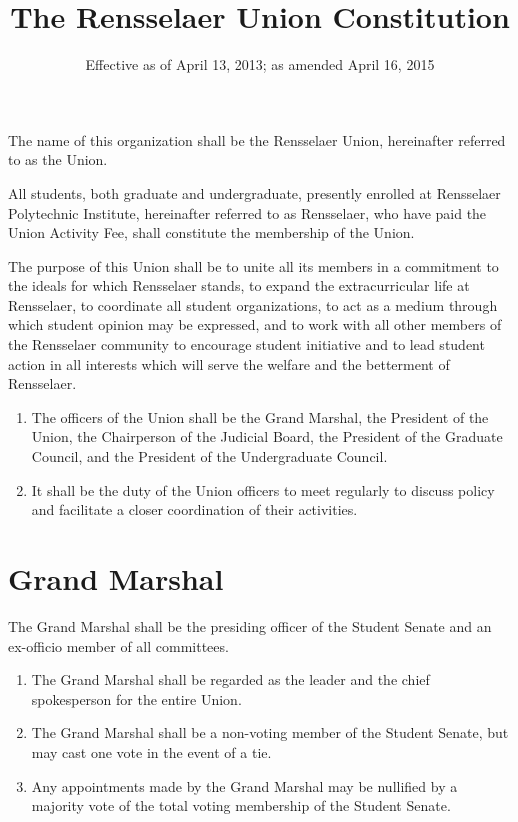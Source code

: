 \documentclass[12pt]{constitution}
\title{The Rensselaer Union Constitution}
\author{Effective as of April 13, 2013; as amended April 16, 2015}
\date{}
\begin{document}
\maketitle
\setcounter{tocdepth}{0}
\newpage

The name of this organization shall be the Rensselaer Union, hereinafter referred to as the Union. 

All students, both graduate and undergraduate, presently enrolled at Rensselaer Polytechnic Institute, hereinafter referred to as Rensselaer, who have paid the Union Activity Fee, shall constitute the membership of the Union.

The purpose of this Union shall be to unite all its members in a commitment to the ideals for which Rensselaer stands, to expand the extracurricular life at Rensselaer, to coordinate all student organizations, to act as a medium through which student opinion may be expressed, and to work with all other members of the Rensselaer community to encourage student initiative and to lead student action in all interests which will serve the welfare and the betterment of Rensselaer.

\begin{enumerate}
\item The officers of the Union shall be the Grand Marshal, the President of the Union, the Chairperson of the Judicial Board, the President of the Graduate Council, and the President of the Undergraduate Council.
\item It shall be the duty of the Union officers to meet regularly to discuss policy and facilitate a closer coordination of their activities.
\end{enumerate}

\section{Grand Marshal}
The Grand Marshal shall be the presiding officer of the Student Senate and an ex-officio member of all committees.

\begin{enumerate}
\item The Grand Marshal shall be regarded as the leader and the chief spokesperson for the entire Union.
\item The Grand Marshal shall be a non-voting member of the Student Senate, but may cast one vote in the event of a tie.
\item Any appointments made by the Grand Marshal may be nullified by a majority vote of the total voting membership of the Student Senate.
\end{enumerate}
\end{document}
